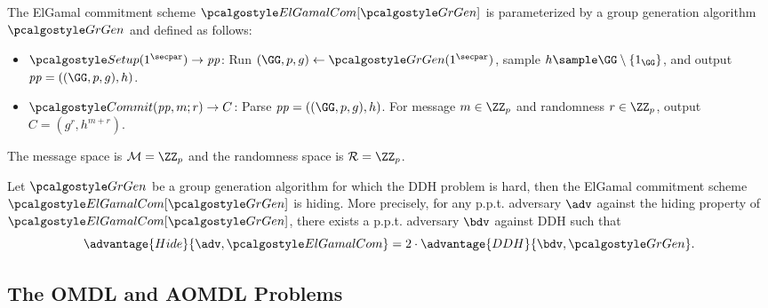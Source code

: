 \begin{definition}
  The ElGamal commitment scheme $\algo{ElGamalCom}[\grgen]$ is parameterized by a group generation algorithm $\grgen$ and defined as follows:
  \begin{itemize}
  \item $\algo{Setup}(1^\secpar) \rightarrow \params$: Run $\gparam \gets \grgen(1^\secpar)$, sample $h \sample \GG \setminus \{1_\GG\}$, and output $\params = (\gparam, h)$.
  \item $\algo{Commit}(\params, m; r) \rightarrow C$: Parse $\params = ((\GG, p, g), h)$. For message $m \in \ZZ_p$ and randomness $r \in \ZZ_p$, output $C = (g^r, h^{m+r})$.
  \end{itemize}
  The message space is $\mathcal{M} = \ZZ_p$ and the randomness space is $\mathcal{R} = \ZZ_p$.
\end{definition}

\begin{theorem}
  Let $\grgen$ be a group generation algorithm for which the DDH problem is hard, then the ElGamal commitment scheme $\algo{ElGamalCom}[\grgen]$ is hiding.
  More precisely, for any p.p.t. adversary $\adv$ against the hiding property of $\algo{ElGamalCom}[\grgen]$, there exists a p.p.t. adversary $\bdv$ against DDH such that
  \[
  \advantage{Hide}{\adv, \algo{ElGamalCom}} = 2 \cdot \advantage{DDH}{\bdv, \grgen}.
  \]
\end{theorem}

\subsection{The OMDL and AOMDL Problems}

